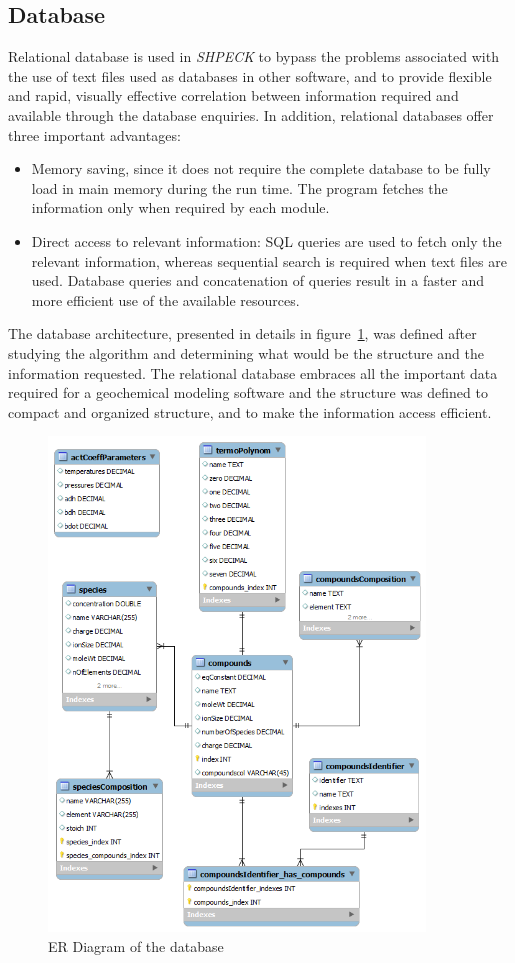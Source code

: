 \documentclass[preprint,12pt,3p]{elsarticle}
\begin{document}
\subsection{Database}
Relational database is used in \emph{SHPECK} to bypass the problems associated with the use of text files used as databases in other software, and to provide flexible and rapid, visually effective correlation between information required and available through the database enquiries. In addition, relational databases offer three important advantages:
\begin{itemize}
\item  Memory saving, since it does not require the complete database to be fully load in main memory during the run time. The program fetches the information only when required by each module. 
\item Direct access to relevant information: SQL queries are used to fetch only the relevant information, whereas sequential search is required when text files are used. Database queries and concatenation of queries result in a faster and more efficient use of the available resources.
\end{itemize}

The database architecture, presented in details in figure~\ref{fig:ERDiagram}, was defined after studying the algorithm and determining what would be the structure and the information requested.  The relational database embraces all the important data required for a geochemical modeling software and the structure was defined to compact and organized structure, and to make the information access efficient. 

\begin{figure}[ht!]
\centering
\includegraphics[width=100mm]{ER_diagram.png}
\caption{ER Diagram of the database}
\label{fig:ERDiagram}
\end{figure}
\end{document}
